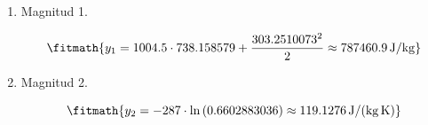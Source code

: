 \begin{enumerate}

\item Magnitud 1.

\[\fitmath{y_{1}=1004.5\cdot 738.158579+\frac{{303.2510073}^{2}}{2}\approx 787460.9\,\mathrm{J/kg}}\]

\item Magnitud 2.

\[\fitmath{y_{2}=-287\cdot \ln\left(0.6602883036\right)\approx 119.1276\,\mathrm{J/(kg\,K)}}\]

\end{enumerate}
